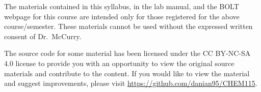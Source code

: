 \documentclass[11pt,letterpaper]{article}
\begin{document}
\vfill

\begin{mdframed}
	\noindent
	The materials contained in this syllabus, in the lab manual, and the
	BOLT webpage for this course are intended only for those registered for
	the above course/semester. These materials cannot be used without the
	expressed written consent of Dr.\ McCurry.

	\bigskip

	\noindent
	The source code for some material has been licensed under the CC
	BY-NC-SA 4.0 license to provide you with an opportunity to view the
	original source materials and contribute to the content. If you would
	like to view the material and suggest improvements, please visit
	\url{https://github.com/danian95/CHEM115}.
\end{mdframed}
\end{document}
